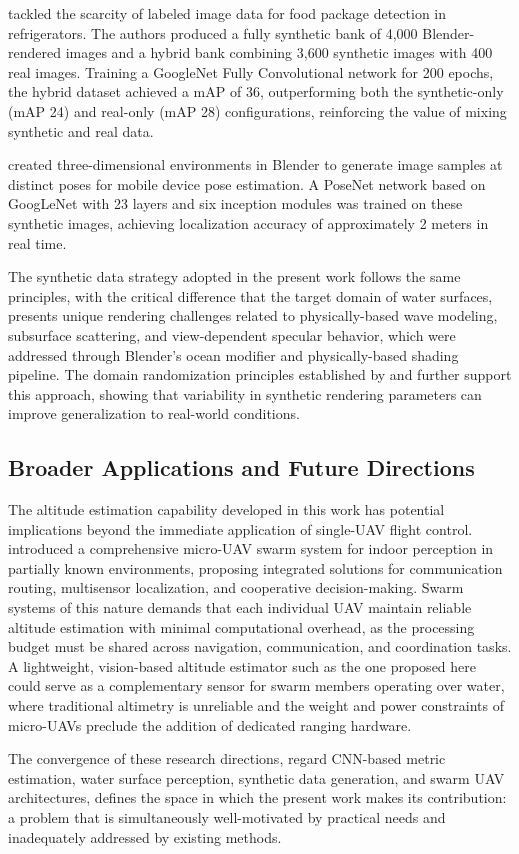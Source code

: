     \cite{ObjetoSintetico} tackled the scarcity of labeled image data for food package detection in refrigerators.
    The authors produced a fully synthetic bank of 4,000 Blender-rendered images and a hybrid bank combining 3,600 synthetic images with 400 real images.
    Training a GoogleNet Fully Convolutional network for 200 epochs, the hybrid dataset achieved a mAP of 36, outperforming both the synthetic-only (mAP 24) and real-only (mAP 28) configurations, reinforcing the value of mixing synthetic and real data.

    \cite{BlenderMapa} created three-dimensional environments in Blender to generate image samples at distinct poses for mobile device pose estimation.
    A PoseNet network based on GoogLeNet with 23 layers and six inception modules was trained on these synthetic images, achieving localization accuracy of approximately 2 meters in real time.

    The synthetic data strategy adopted in the present work follows the same principles, with the critical difference that the target domain of water surfaces, presents unique rendering challenges related to physically-based wave modeling, subsurface scattering, and view-dependent specular behavior, which were addressed through Blender's ocean modifier and physically-based shading pipeline.
    The domain randomization principles established by \cite{Tobin2017} and \cite{Tremblay2018} further support this approach, showing that variability in synthetic rendering parameters can improve generalization to real-world conditions.

    \subsection{Broader Applications and Future Directions}

    The altitude estimation capability developed in this work has potential implications beyond the immediate application of single-UAV flight control.
    \cite{XuMicroUAVSwarm2025} introduced a comprehensive micro-UAV swarm system for indoor perception in partially known environments, proposing integrated solutions for communication routing, multisensor localization, and cooperative decision-making.
    Swarm systems of this nature demands that each individual UAV maintain reliable altitude estimation with minimal computational overhead, as the processing budget must be shared across navigation, communication, and coordination tasks.
    A lightweight, vision-based altitude estimator such as the one proposed here could serve as a complementary sensor for swarm members operating over water, where traditional altimetry is unreliable and the weight and power constraints of micro-UAVs preclude the addition of dedicated ranging hardware.

    The convergence of these research directions, regard CNN-based metric estimation, water surface perception, synthetic data generation, and swarm UAV architectures, defines the space in which the present work makes its contribution: a problem that is simultaneously well-motivated by practical needs and inadequately addressed by existing methods.